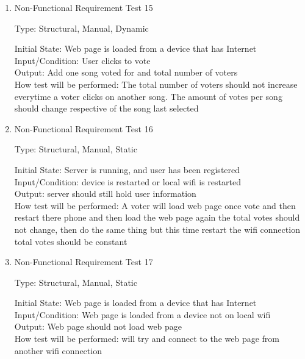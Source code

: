 \documentclass[12pt, titlepage]{article}
\begin{document}
\begin{enumerate}


\item{Non-Functional Requirement Test 15\\}

Type: Structural, Manual, Dynamic
					
Initial State: Web page is loaded from a device that has Internet \\
					
Input/Condition: User clicks to vote \\
					
Output: Add one song voted for and total number of voters \\
					
How test will be performed: The total number of voters should not increase everytime a voter clicks
on another song. The amount of votes per song should change respective of the song last selected\\


\item{Non-Functional Requirement Test 16\\}

Type: Structural, Manual, Static
					
Initial State: Server is running, and user has been registered \\
					
Input/Condition: device is restarted or local wifi is restarted \\
					
Output: server should still hold user information \\
					
How test will be performed: A voter will load web page once vote and then restart there phone
and then load the web page again the total votes should not change, then do the same thing
but this time restart the wifi connection total votes should be constant \\
\item{Non-Functional Requirement Test 17\\}

Type: Structural, Manual, Static
					
Initial State: Web page is loaded from a device that has Internet \\
					
Input/Condition: Web page is loaded from a device not on local wifi \\
					
Output: Web page should not load web page \\
					
How test will be performed: will try and connect to the web page from another wifi connection \\
\end{enumerate}
\end{document}
